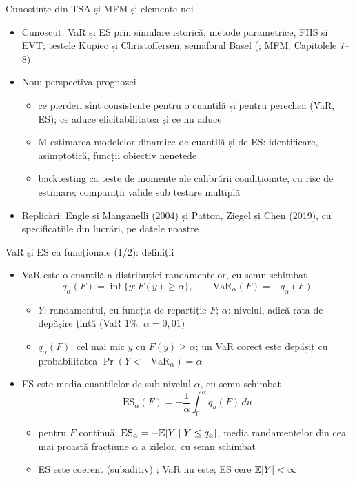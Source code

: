 \begin{frame}{Cunoștințe din TSA și MFM și elemente noi}
\itemsize{\small}
\begin{itemize}
    \item Cunoscut: VaR și ES prin simulare istorică, metode parametrice, FHS și EVT; testele Kupiec și Christoffersen; semaforul Basel (; MFM, Capitolele 7--8)
    \item Nou: perspectiva prognozei
    \begin{itemize}
        \item ce pierderi sînt consistente pentru o cuantilă și pentru perechea (VaR, ES); ce aduce elicitabilitatea și ce nu aduce
        \item M-estimarea modelelor dinamice de cuantilă și de ES: identificare, asimptotică, funcții obiectiv nenetede
        \item backtesting ca teste de momente ale calibrării condiționate, cu risc de estimare; comparații valide sub testare multiplă
    \end{itemize}
    \item Replicări: Engle și Manganelli (2004) și Patton, Ziegel și Chen (2019), cu specificațiile din lucrări, pe datele noastre
\end{itemize}
\end{frame}

\begin{frame}{VaR și ES ca funcționale (1/2): definiții}
\itemsize{\small}
\begin{itemize}
    \item VaR este o cuantilă a distribuției randamentelor, cu semn schimbat
    \[ q_\alpha(F) = \inf\{y: F(y) \ge \alpha\}, \qquad \mathrm{VaR}_\alpha(F) = -q_\alpha(F) \]
    \begin{itemize}
        \item $Y$: randamentul, cu funcția de repartiție $F$; $\alpha$: nivelul, adică rata de depășire țintă (VaR 1\%: $\alpha = 0{,}01$)
        \item $q_\alpha(F)$: cel mai mic $y$ cu $F(y) \ge \alpha$; un VaR corect este depășit cu probabilitatea $\Pr(Y < -\mathrm{VaR}_\alpha) = \alpha$
    \end{itemize}
    \item ES este media cuantilelor de sub nivelul $\alpha$, cu semn schimbat 
    \[ \mathrm{ES}_\alpha(F) = -\frac{1}{\alpha}\int_0^\alpha q_u(F)\,du \]
    \begin{itemize}
        \item pentru $F$ continuă: $\mathrm{ES}_\alpha = -\mathbb{E}[Y \mid Y \le q_\alpha]$, media randamentelor din cea mai proastă fracțiune $\alpha$ a zilelor, cu semn schimbat
        \item ES este coerent (subaditiv) ; VaR nu este; ES cere $\mathbb{E}|Y| < \infty$
    \end{itemize}
\end{itemize}
\end{frame}

